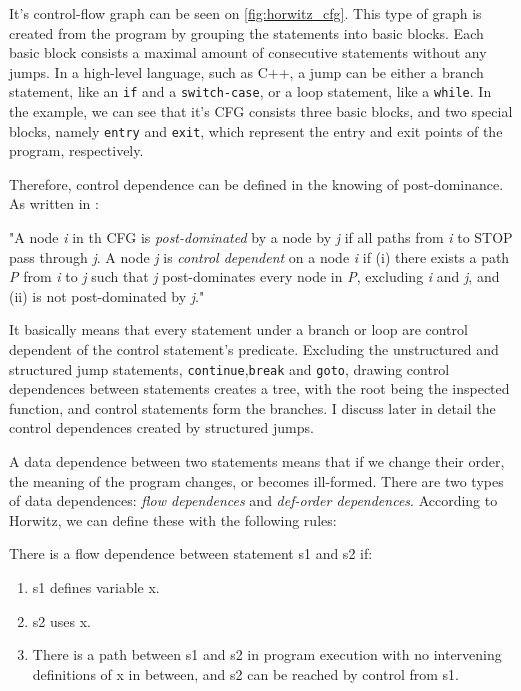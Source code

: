 \documentclass[oneside,12pt,a4paper]{book}
\begin{document}
It's control-flow graph can be seen on \ref{fig:horwitz_cfg}. This type of graph is created from the program by grouping the statements into basic blocks. Each basic block consists a maximal amount of consecutive statements without any jumps. In a high-level language, such as C++, a jump can be either a branch statement, like an \texttt{if} and a \texttt{switch-case}, or a loop statement, like a \texttt{while}. In the example, we can see that it's CFG consists three basic blocks, and two special blocks, namely \texttt{entry} and \texttt{exit}, which represent the entry and exit points of the program, respectively.

Therefore, control dependence can be defined in the knowing of post-dominance. As written in \cite{slicing-survey}:

"A node \textit{i} in th CFG is \textit{post-dominated} by a node by \textit{j} if all paths from \textit{i} to STOP pass through \textit{j}. A node \textit{j} is \textit{control dependent} on a node \textit{i} if (i) there exists a path \textit{P} from \textit{i} to \textit{j} such that \textit{j} post-dominates every node in \textit{P}, excluding \textit{i} and \textit{j}, and (ii) is not post-dominated by \textit{j}."

It basically means that every statement under a branch or loop are control dependent of the control statement's predicate. Excluding the unstructured and structured jump statements, \texttt{continue},\texttt{break} and \texttt{goto}, drawing control dependences between statements creates a tree, with the root being the inspected function, and control statements form the branches. I discuss later in detail the control dependences created by structured jumps. 

A data dependence between two statements means that if we change their order, the meaning of the program changes, or becomes ill-formed. There are two types of data dependences: \textit{flow dependences} and \textit{def-order dependences}. According to Horwitz\cite{horwitz-interproc}, we can define these with the following rules:

There is a flow dependence between statement s1 and s2 if:
\begin{enumerate}
  \item s1 defines variable x.
  \item s2 uses x.
  \item There is a path between s1 and s2 in program execution with no intervening definitions of x in between, and s2 can be reached by control from s1. 
\end{enumerate}
\end{document}
